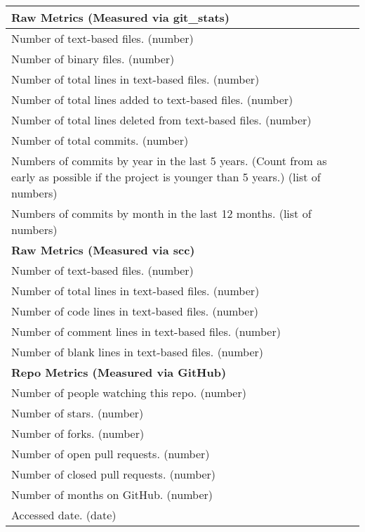 \begin{table}[H]
\begin{tabular}{p{14cm}}
\hline		
\textbf{Raw Metrics (Measured via git\_stats)}\\
\hline
Number of text-based files. (number)\\
Number of binary files. (number)\\
Number of total lines in text-based files. (number)\\
Number of total lines added to text-based files. (number)\\
Number of total lines deleted from text-based files. (number)\\
Number of total commits. (number)\\
Numbers of commits by year in the last 5 years. (Count from as early as possible if the project is younger than 5 years.) (list of numbers)\\
Numbers of commits by month in the last 12 months. (list of numbers)\\
\hline		
\textbf{Raw Metrics (Measured via scc)}\\
\hline
Number of text-based files. (number)\\
Number of total lines in text-based files. (number)\\
Number of code lines in text-based files. (number)\\
Number of comment lines in text-based files. (number)\\
Number of blank lines in text-based files. (number)\\
\hline
\textbf{Repo Metrics (Measured via GitHub)}\\
\hline
Number of people watching this repo. (number)\\
Number of stars. (number)\\
Number of forks. (number)\\
Number of open pull requests. (number)\\
Number of closed pull requests. (number)\\
Number of months on GitHub. (number)\\
Accessed date. (date)\\
\hline
\end{tabular}
\end{table}

\endgroup